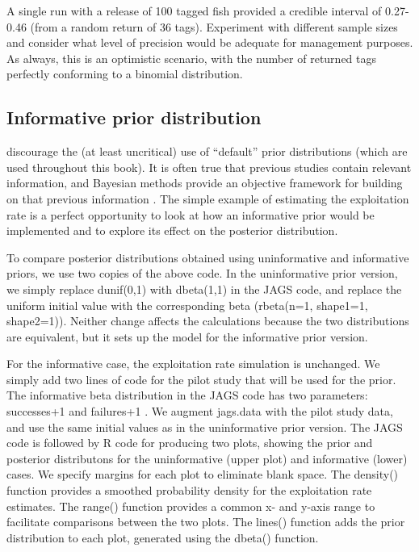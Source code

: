 \documentclass[
]{krantz}
\begin{document}
A single run with a release of 100 tagged fish provided a credible interval of 0.27-0.46 (from a random return of 36 tags). Experiment with different sample sizes and consider what level of precision would be adequate for management purposes. As always, this is an optimistic scenario, with the number of returned tags perfectly conforming to a binomial distribution.

\hypertarget{InformativePriors}{%
\subsection{Informative prior distribution}\label{InformativePriors}}

\citet{banner.etal_2020} discourage the (at least uncritical) use of ``default'' prior distributions (which are used throughout this book). It is often true that previous studies contain relevant information, and Bayesian methods provide an objective framework for building on that previous information \citep{mccarthy2007}. The simple example of estimating the exploitation rate is a perfect opportunity to look at how an informative prior would be implemented and to explore its effect on the posterior distribution.

To compare posterior distributions obtained using uninformative and informative priors, we use two copies of the above code. In the uninformative prior version, we simply replace dunif(0,1) with dbeta(1,1) in the JAGS code, and replace the uniform initial value with the corresponding beta (rbeta(n=1, shape1=1, shape2=1)). Neither change affects the calculations because the two distributions are equivalent, but it sets up the model for the informative prior version.

For the informative case, the exploitation rate simulation is unchanged. We simply add two lines of code for the pilot study that will be used for the prior. The informative beta distribution in the JAGS code has two parameters: successes+1 and failures+1 \citep{bolker2008}. We augment jags.data with the pilot study data, and use the same initial values as in the uninformative prior version. The JAGS code is followed by R code for producing two plots, showing the prior and posterior distributons for the uninformative (upper plot) and informative (lower) cases. We specify margins for each plot to eliminate blank space. The density() function provides a smoothed probability density for the exploitation rate estimates. The range() function provides a common x- and y-axis range to facilitate comparisons between the two plots. The lines() function adds the prior distribution to each plot, generated using the dbeta() function.
\end{document}

